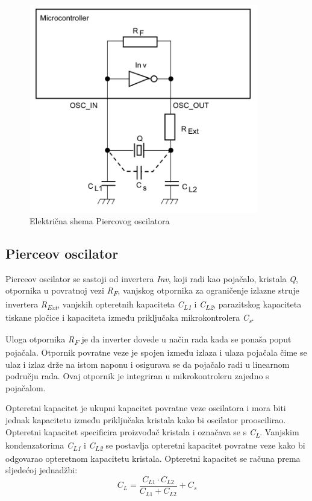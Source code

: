 \begin{figure}[hbt]
    \centering
    \includegraphics[width=10cm]{Figures/pierce.PNG}
    \caption{Električna shema Piercovog oscilatora \cite{stmicroelectronics:an2867}}
    \label{slk:PIERCE}
\end{figure}

\subsection{Pierceov oscilator}
Pierceov oscilator se sastoji od invertera \textit{Inv}, koji radi kao pojačalo, kristala \textit{Q}, otpornika u povratnoj vezi \textit{R\textsubscript{F}}, vanjskog otpornika za ograničenje izlazne struje invertera \textit{R\textsubscript{Ext}}, vanjskih opteretnih kapaciteta \textit{C\textsubscript{L1}} i \textit{C\textsubscript{L2}}, parazitskog kapaciteta tiskane pločice i kapaciteta između priključaka mikrokontrolera \textit{C\textsubscript{s}}.

Uloga otpornika \textit{R\textsubscript{F}} je da inverter dovede u način rada kada se ponaša poput pojačala. Otpornik povratne veze je spojen između izlaza i ulaza pojačala čime se ulaz i izlaz drže na istom naponu i osigurava se da pojačalo radi u linearnom području rada. Ovaj otpornik je integriran u mikrokontroleru zajedno s pojačalom.

Opteretni kapacitet je ukupni kapacitet povratne veze oscilatora i mora biti jednak kapacitetu između priključaka kristala kako bi oscilator prooscilirao. Opteretni kapacitet specificira proizvođač kristala i označava se s \textit{C\textsubscript{L}}. Vanjskim kondenzatorima \textit{C\textsubscript{L1}} i \textit{C\textsubscript{L2}} se postavlja opteretni kapacitet povratne veze kako bi odgovarao opteretnom kapacitetu kristala. Opteretni kapacitet se računa prema sljedećoj jednadžbi:
\begin{equation} \label{eq:CLOAD}
    C_L=\frac{C_{L1}\cdot C_{L2}}{C_{L1}+C_{L2}}+C_s
\end{equation}

